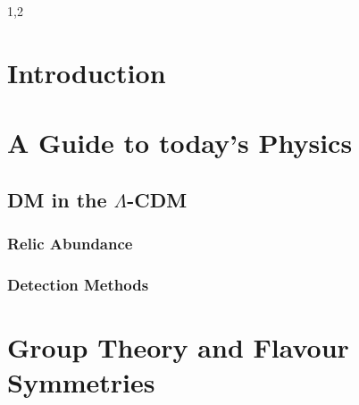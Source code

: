 \documentclass[11pt,a4paper,twoside]{article}
\numberwithin{equation}{section}
\begin{document}
\begin{spacing}{1,2}

\thispagestyle{empty}
 \cleardoublepage

\setcounter{page}{1}
\pagestyle{fancy}

\section{Introduction}


\section{A Guide to today's Physics}
\label{sec_guide}
% 
% 
% 



% 

\subsection{DM in the $\Lambda$-CDM}




\subsubsection{Relic Abundance}
\label{sec_RD}



\subsubsection{Detection Methods}
\label{sec_DMDetection}


\section{Group Theory and Flavour Symmetries}
\label{sec_GT}





\label{sec_modeloutline}


\end{spacing}
\end{document}
